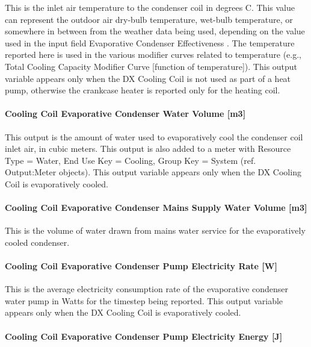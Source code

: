 This is the inlet air temperature to the condenser coil in degrees C. This value can represent the outdoor air dry-bulb temperature, wet-bulb temperature, or somewhere in between from the weather data being used, depending on the value used in the input field Evaporative Condenser Effectiveness . The temperature reported here is used in the various modifier curves related to temperature (e.g., Total Cooling Capacity Modifier Curve {[}function of temperature{]}). This output variable appears only when the DX Cooling Coil is not used as part of a heat pump, otherwise the crankcase heater is reported only for the heating coil.

\paragraph{Cooling Coil Evaporative Condenser Water Volume {[}m3{]}}\label{cooling-coil-evaporative-condenser-water-volume-m3}

This output is the amount of water used to evaporatively cool the condenser coil inlet air, in cubic meters. This output is also added to a meter with Resource Type = Water, End Use Key = Cooling, Group Key = System (ref. Output:Meter objects). This output variable appears only when the DX Cooling Coil is evaporatively cooled.

\paragraph{Cooling Coil Evaporative Condenser Mains Supply Water Volume {[}m3{]}}\label{cooling-coil-evaporative-condenser-mains-supply-water-volume-m3}

This is the volume of water drawn from mains water service for the evaporatively cooled condenser.

\paragraph{Cooling Coil Evaporative Condenser Pump Electricity Rate {[}W{]}}\label{cooling-coil-evaporative-condenser-pump-electric-power-w}

This is the average electricity consumption rate of the evaporative condenser water pump in Watts for the timestep being reported. This output variable appears only when the DX Cooling Coil is evaporatively cooled.

\paragraph{Cooling Coil Evaporative Condenser Pump Electricity Energy {[}J{]}}\label{cooling-coil-evaporative-condenser-pump-electric-energy-j}

